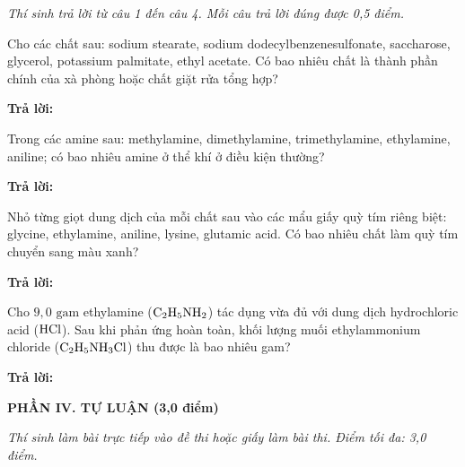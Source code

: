 \documentclass[11pt,a4paper]{article}
\begin{document}
\textit{Thí sinh trả lời từ câu 1 đến câu 4. Mỗi câu trả lời đúng được 0,5 điểm.}

\vspace{2pt}

\begin{ex}
Cho các chất sau: sodium stearate, sodium dodecylbenzenesulfonate, saccharose, glycerol, potassium palmitate, ethyl acetate. Có bao nhiêu chất là thành phần chính của xà phòng hoặc chất giặt rửa tổng hợp?
\par\noindent\textbf{Trả lời:} \dotfill
\end{ex}
\begin{ex}
Trong các amine sau: methylamine, dimethylamine, trimethylamine, ethylamine, aniline; có bao nhiêu amine ở thể khí ở điều kiện thường?
\par\noindent\textbf{Trả lời:} \dotfill
\end{ex}
\begin{ex}
Nhỏ từng giọt dung dịch của mỗi chất sau vào các mẩu giấy quỳ tím riêng biệt: glycine, ethylamine, aniline, lysine, glutamic acid. Có bao nhiêu chất làm quỳ tím chuyển sang màu xanh?
\par\noindent\textbf{Trả lời:} \dotfill
\end{ex}
\begin{ex}
Cho $9{,}0\text{ gam}$ ethylamine ($\ce{C2H5NH2}$) tác dụng vừa đủ với dung dịch hydrochloric acid ($\ce{HCl}$). Sau khi phản ứng hoàn toàn, khối lượng muối ethylammonium chloride ($\ce{C2H5NH3Cl}$) thu được là bao nhiêu gam?
\par\noindent\textbf{Trả lời:} \dotfill
\end{ex}
\vspace{6pt}
\noindent
{\color{mainGreen}\textbf{\large PHẦN IV. TỰ LUẬN (3,0 điểm)}}

\textit{Thí sinh làm bài trực tiếp vào đề thi hoặc giấy làm bài thi. Điểm tối đa: 3,0 điểm.}

\vspace{2pt}
\end{document}
